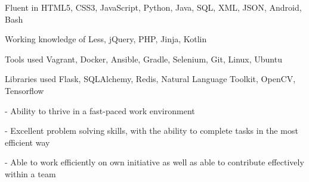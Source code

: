 



 
 
\begin{cvskills}

\cvskill
    {Fluent in} %
    {HTML5, CSS3, JavaScript, Python, Java, SQL, XML, JSON, Android, Bash} %

\cvskill
    {Working knowledge of} %
    {Less, jQuery, PHP,  Jinja, Kotlin} %
    
\cvskill
    {Tools used} %
    {Vagrant, Docker, Ansible, Gradle, Selenium, Git, Linux, Ubuntu} %
    
\cvskill
    {Libraries used} %
    {Flask, SQLAlchemy, Redis, Natural Language Toolkit, OpenCV, Tensorflow} %
    
\cvskill
    {-} %
    {Ability to thrive in a fast-paced work environment} %
    
\cvskill
    {-} %
    {Excellent problem solving skills, with the ability to complete tasks in the most efficient way} %
    
    
\cvskill
    {-} %
    {Able to work efficiently on own initiative as well as able to contribute effectively within a team} %
    
\end{cvskills}